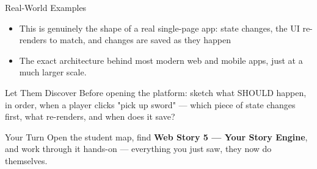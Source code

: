 \documentclass[aspectratio=169]{beamer}
\begin{document}
\begin{frame}{Real-World Examples}
    \large
    \begin{itemize}
        \item This is genuinely the shape of a real single-page app: state changes, the UI re-renders to match, and changes are saved as they happen
        \item The exact architecture behind most modern web and mobile apps, just at a much larger scale.
    \end{itemize}
\end{frame}


\begin{frame}{Let Them Discover}
    \Large
    Before opening the platform: sketch what SHOULD happen, in order, when a player clicks "pick up sword" — which piece of state changes first, what re-renders, and when does it save?
\end{frame}

\begin{frame}{Your Turn}
    \Large
    Open the student map, find \textbf{Web Story 5 — Your Story Engine}, and work through it
    hands-on --- everything you just saw, they now do themselves.
\end{frame}
\end{document}
